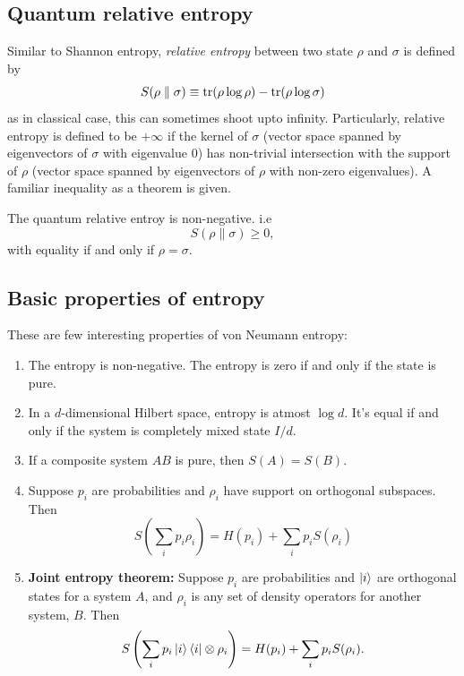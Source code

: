 \subsection{Quantum relative entropy}
Similar to Shannon entropy, \textit{relative entropy} between two state $\rho$ and $\sigma$ is defined by
\begin{equation}
    S(\rho \parallel \sigma) \equiv \text{tr}(\rho \log{\rho}) - \text{tr}(\rho \log{\sigma})
\end{equation}
as in classical case, this can sometimes shoot upto infinity. Particularly, relative entropy is defined to be $+\infty$ if the kernel of $\sigma$ (vector space spanned by eigenvectors of $\sigma$ with eigenvalue $0$) has non-trivial intersection with the support of $\rho$ (vector space spanned by eigenvectors of $\rho$ with non-zero eigenvalues). A familiar inequality as a theorem is given.
\begin{theorem}
    The quantum relative entroy is non-negative. i.e
    \begin{equation}
        S(\rho \parallel \sigma) \geq 0,
    \end{equation}
    with equality if and only if $\rho=\sigma$.
\end{theorem}

\subsection{Basic properties of entropy}
These are few interesting properties of von Neumann entropy:
\begin{ntheorem}
    \begin{enumerate}
        \item The entropy is non-negative. The entropy is zero if and only if the state is pure.
        \item In a $d$-dimensional Hilbert space, entropy is atmost $\log{d}$. It's equal if and only if the system is completely mixed state $I/d$.
        \item If a composite system $AB$ is pure, then $S(A)=S(B)$.
        \item Suppose $p_i$ are probabilities and $\rho_i$ have support on orthogonal subspaces. Then 
        \begin{equation}
            S\left( \sum_i p_i\rho_i \right) = H(p_i) + \sum_i p_iS(\rho_i)
        \end{equation}
        \item \textbf{Joint entropy theorem:} Suppose $p_i$ are probabilities and $\ket{i}$ are orthogonal states for a system $A$, and $\rho_i$ is any set of density operators for another system, $B$. Then
        \begin{equation}
            S\left( \sum_i p_i\ket{i}\bra{i} \otimes \rho_i \right) = H(p_i) + \sum_i p_iS(\rho_i).
        \end{equation}
    \end{enumerate}
\end{ntheorem}

